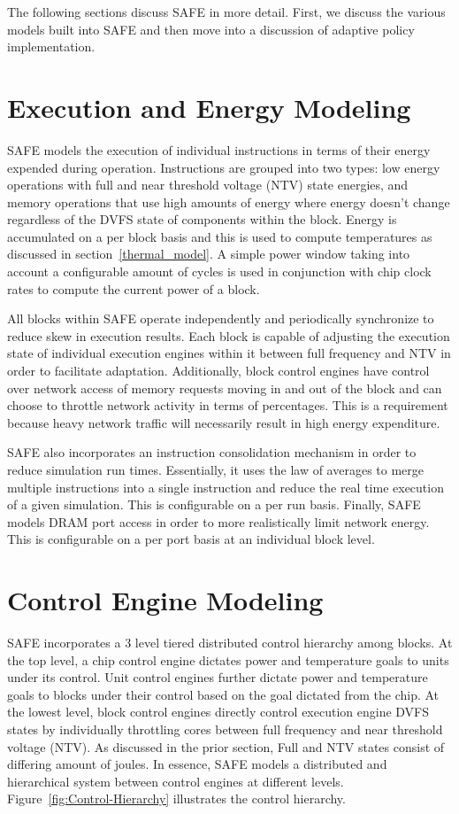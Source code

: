 The following sections discuss SAFE in more detail. First, we discuss the various models built into SAFE and then move into a discussion of adaptive policy implementation.

\section{Execution and Energy Modeling}
    SAFE models the execution of individual instructions in terms of their energy expended during operation. Instructions are grouped into two types: low energy operations with full and near threshold voltage (NTV) state energies, and memory operations that use high amounts of energy where energy doesn't change regardless of the DVFS state of components within the block. Energy is accumulated on a per block basis and this is used to compute temperatures as discussed in section~\ref{thermal_model}. A simple power window taking into account a configurable amount of cycles is used in conjunction with chip clock rates to compute the current power of a block.

    All blocks within SAFE operate independently and periodically synchronize to reduce skew in execution results. Each block is capable of adjusting the execution state of individual execution engines within it between full frequency and NTV in order to facilitate adaptation. Additionally, block control engines have control over network access of memory requests moving in and out of the block and can choose to throttle network activity in terms of percentages. This is a requirement because heavy network traffic will necessarily result in high energy expenditure.

    SAFE also incorporates an instruction consolidation mechanism in order to reduce simulation run times. Essentially, it uses the law of averages to merge multiple instructions into a single instruction and reduce the real time execution of a given simulation. This is configurable on a per run basis. Finally, SAFE models DRAM port access in order to more realistically limit network energy. This is configurable on a per port basis at an individual block level.

\section{Control Engine Modeling}
    \label{ControlEngineModeling}
    SAFE incorporates a 3 level tiered distributed control hierarchy among blocks. At the top level, a chip control engine dictates power and temperature goals to units under its control. Unit control engines further dictate power and temperature goals to blocks under their control based on the goal dictated from the chip. At the lowest level, block control engines directly control execution engine DVFS states by individually throttling cores between full frequency and near threshold voltage (NTV). As discussed in the prior section, Full and NTV states consist of differing amount of joules. In essence, SAFE models a distributed and hierarchical system between control engines at different levels. Figure~\ref{fig:Control-Hierarchy} illustrates the control hierarchy. 

